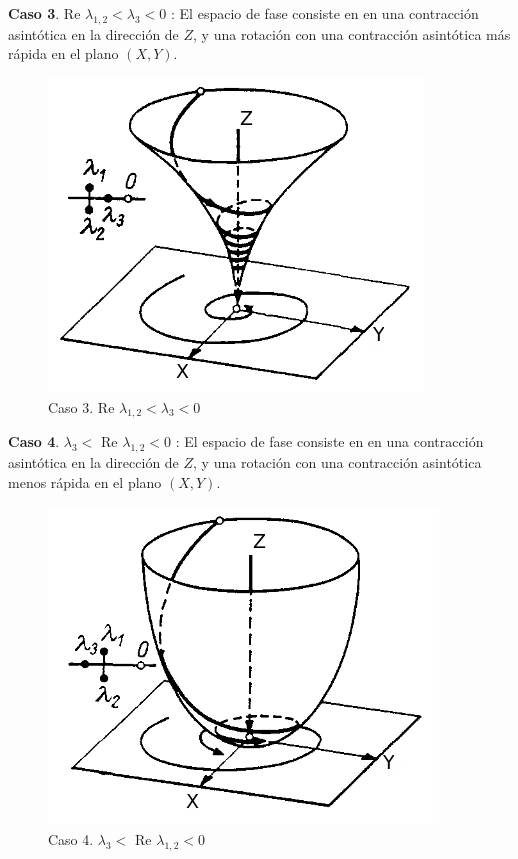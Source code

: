 \documentclass[a4paper,10pt]{article}
\numberwithin{equation}{section}
\begin{document}
\textbf{Caso 3}. Re $\lambda_{1,2} < \lambda_3 < 0$ : El espacio de fase consiste en en una contracción asintótica
en la dirección de $Z$, y una rotación con una contracción asintótica más rápida en el plano
$(X,Y)$.

\begin{figure}[H]
 \centering
\includegraphics[scale=0.35]{problema3fig4}
\caption{Caso 3. Re $\lambda_{1,2} < \lambda_3 < 0$}
\label{fig:problema3fig4}
\end{figure}
\vspace{.3cm}

\textbf{Caso 4}. $\lambda_3 <$ Re $\lambda_{1,2} < 0$ : El espacio de fase consiste en en una contracción asintótica
en la dirección de $Z$, y una rotación con una contracción asintótica menos rápida en el plano
$(X,Y)$.

\begin{figure}[H]
 \centering
\includegraphics[scale=0.35]{problema3fig5}
\caption{Caso 4. $\lambda_3 <$ Re $\lambda_{1,2} < 0$}
\label{fig:problema3fig5}
\end{figure}
\vspace{.3cm}
\end{document}
